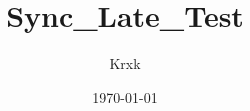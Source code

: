 \documentclass{article}
\begin{document}
\pagestyle{fancy}
\hypersetup{hidelinks}

\title{Sync\_Late\_Test}
\author{Krxk}
\date{\today}
\maketitle
\newpage
\tableofcontents
\newpage



\end{document}
